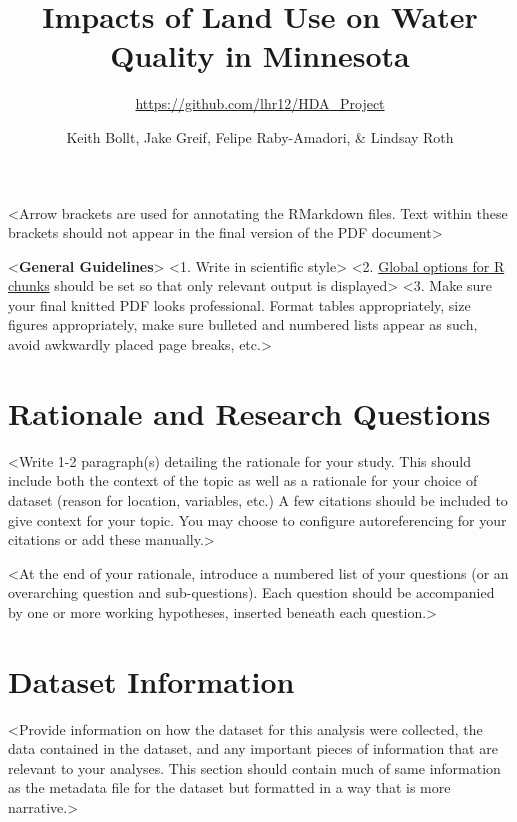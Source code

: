 \documentclass[12pt,]{article}
\title{Impacts of Land Use on Water Quality in Minnesota}
\subtitle{\url{https://github.com/lhr12/HDA_Project}}
\author{Keith Bollt, Jake Greif, Felipe Raby-Amadori, \& Lindsay Roth}
\date{}
\begin{document}
\maketitle

\newpage

\textless{}Arrow brackets are used for annotating the RMarkdown files.
Text within these brackets should not appear in the final version of the
PDF document\textgreater{}

\textless{}\textbf{General Guidelines}\textgreater{} \textless{}1. Write
in scientific style\textgreater{} \textless{}2.
\href{https://rmarkdown.rstudio.com/lesson-3.html}{Global options for R
chunks} should be set so that only relevant output is
displayed\textgreater{} \textless{}3. Make sure your final knitted PDF
looks professional. Format tables appropriately, size figures
appropriately, make sure bulleted and numbered lists appear as such,
avoid awkwardly placed page breaks, etc.\textgreater{}

\hypertarget{rationale-and-research-questions}{%
\section{Rationale and Research
Questions}\label{rationale-and-research-questions}}

\textless{}Write 1-2 paragraph(s) detailing the rationale for your
study. This should include both the context of the topic as well as a
rationale for your choice of dataset (reason for location, variables,
etc.) A few citations should be included to give context for your topic.
You may choose to configure autoreferencing for your citations or add
these manually.\textgreater{}

\textless{}At the end of your rationale, introduce a numbered list of
your questions (or an overarching question and sub-questions). Each
question should be accompanied by one or more working hypotheses,
inserted beneath each question.\textgreater{}

\newpage

\hypertarget{dataset-information}{%
\section{Dataset Information}\label{dataset-information}}

\textless{}Provide information on how the dataset for this analysis were
collected, the data contained in the dataset, and any important pieces
of information that are relevant to your analyses. This section should
contain much of same information as the metadata file for the dataset
but formatted in a way that is more narrative.\textgreater{}
\end{document}
